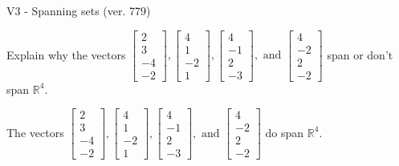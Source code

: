 \begin{exercise}
  \begin{exerciseTitle}V3 - Spanning sets (ver. 779)\end{exerciseTitle}
  \begin{exerciseStatement}
    Explain why the vectors \(\left[\begin{array}{r}
2 \\
3 \\
-4 \\
-2
\end{array}\right] , \left[\begin{array}{r}
4 \\
1 \\
-2 \\
1
\end{array}\right] , \left[\begin{array}{r}
4 \\
-1 \\
2 \\
-3
\end{array}\right] , \text{ and } \left[\begin{array}{r}
4 \\
-2 \\
2 \\
-2
\end{array}\right]\) span or don't span \(\mathbb{R}^4\). 
	


  \end{exerciseStatement}
  \begin{exerciseAnswer}
   The vectors \(\left[\begin{array}{r}
2 \\
3 \\
-4 \\
-2
\end{array}\right] , \left[\begin{array}{r}
4 \\
1 \\
-2 \\
1
\end{array}\right] , \left[\begin{array}{r}
4 \\
-1 \\
2 \\
-3
\end{array}\right] , \text{ and } \left[\begin{array}{r}
4 \\
-2 \\
2 \\
-2
\end{array}\right]\) 
  	 do  
	span \(\mathbb{R}^4\).
  


  \end{exerciseAnswer}
\end{exercise}